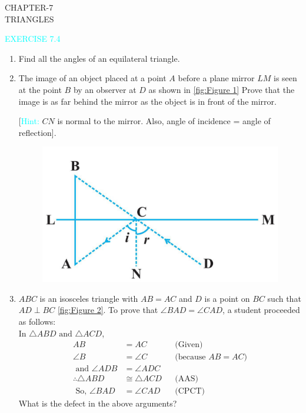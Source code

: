 \documentclass {article}
\begin{document}
\begin{center}
	{\Large CHAPTER-7\\\vspace{0.2cm} TRIANGLES}
\end{center}

\textcolor{cyan}{\large EXERCISE 7.4}
\begin {enumerate}
\item Find all the angles of an equilateral triangle.
\item The image of an object placed at a point $A$ before a plane mirror $LM$ is seen at the point $B$ by an observer at $D$ as shown in \eqref{fig:Figure 1} Prove that the image is as far behind the mirror as the object is in front  of the mirror.

[\textcolor{cyan}{Hint:} $CN$ is normal to the mirror. Also, angle of incidence = angle of reflection].
\begin{figure}[!h]
\centering
	\includegraphics[width=0.3\columnwidth]{./figs/7A.png}
\caption{}
\label{fig:Figure 1}
\end{figure}
\item $ABC$ is an isosceles triangle with $AB = AC$ and $D$ is a point on $BC$ such that $AD\perp  BC$ \eqref{fig:Figure 2}. To prove that $\angle BAD = \angle CAD$, a student proceeded as follows:\\
In $\triangle  ABD \text{ and }\triangle  ACD$,
\begin{align}
AB &= AC &&\text{(Given)}\\
\angle B &= \angle C &&\text{(because $AB = AC$)}\\
\text{ and }
\angle ADB &= \angle ADC\\
\therefore \triangle  ABD &\cong  \triangle ACD &&\text {(AAS)} \\
\text { So, }  \angle BAD &= \angle CAD &&\text{(CPCT)}
\end{align}
What is the defect in the above arguments?


\end{enumerate}
\end{document}
